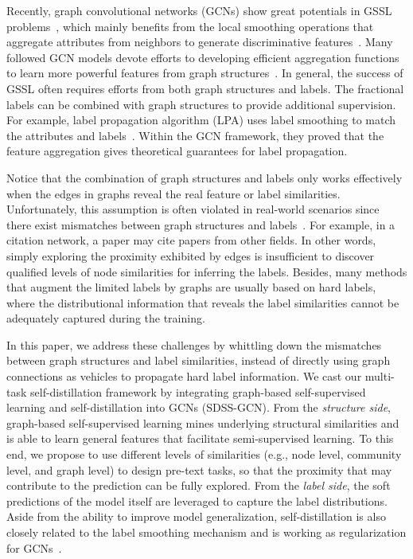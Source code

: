 \documentclass[letterpaper]{article} \usepackage{aaai22} \usepackage{times} \usepackage{helvet} \usepackage{courier} \usepackage[hyphens]{url} \usepackage{graphicx} \urlstyle{rm} \def\UrlFont{\rm} \usepackage{subfigure}
\begin{document}
	Recently, graph convolutional networks (GCNs) show great potentials in GSSL problems~\cite{kipf2016semiGCN}, which mainly benefits from the local smoothing operations that aggregate attributes from neighbors to generate discriminative features~\cite{li2018deeper}. Many followed GCN models devote efforts to developing efficient aggregation functions to learn more powerful features from graph structures~\cite{velivckovic2017GAT, Klicpera2019APPNP}. In general, the success of GSSL often requires efforts from both graph structures and labels. The fractional labels can be combined with graph structures to provide additional supervision. For example, label propagation algorithm (LPA) uses label smoothing to match the attributes and labels~\cite{li2019label, wang2020unifying}. Within the GCN framework, they proved that the feature aggregation gives theoretical guarantees for label propagation.
	
	Notice that the combination of graph structures and labels only works effectively when the edges in graphs reveal the real feature or label similarities. Unfortunately, this assumption is often violated in real-world scenarios since there exist mismatches between graph structures and labels~\cite{Yuto2017LPfail, chien2020adaptive}. For example, in a citation network, a paper may cite papers from other fields. In other words, simply exploring the proximity exhibited by edges is insufficient to discover qualified levels of node similarities for inferring the labels. Besides, many methods that augment the limited labels by graphs are usually based on hard labels, where the distributional information that reveals the label similarities cannot be adequately captured during the training.
	
	In this paper, we address these challenges by whittling down the mismatches between graph structures and label similarities, instead of directly using graph connections as vehicles to propagate hard label information. We cast our multi-task self-distillation framework by integrating graph-based self-supervised learning and self-distillation into GCNs (SDSS-GCN). From the \emph{structure side}, graph-based self-supervised learning mines underlying structural similarities and is able to learn general features that facilitate semi-supervised learning. To this end, we propose to use different levels of similarities (e.g., node level, community level, and graph level) to design pre-text tasks, so that the proximity that may contribute to the prediction can be fully explored. From the \emph{label side}, the soft predictions of the model itself are leveraged to capture the label distributions. Aside from the ability to improve model generalization, self-distillation is also closely related to the label smoothing mechanism and is working as regularization for GCNs~\cite{zhang2020self}.
	
\end{document}
